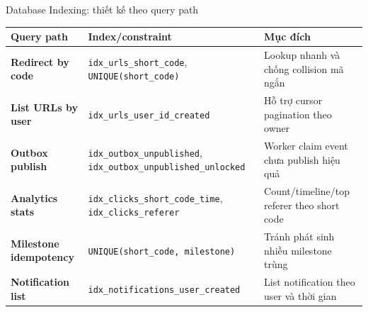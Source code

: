 \documentclass[aspectratio=169]{beamer}
\begin{document}
\begin{frame}{Database Indexing: thiết kế theo query path}
    \scriptsize
    \begin{center}
    \begin{tabular}{>{\bfseries}p{}p{}p{}}
        \toprule
        Query path & Index/constraint & Mục đích \\
        \midrule
        Redirect by code & \texttt{idx\_urls\_short\_code}, \texttt{UNIQUE(short\_code)} & Lookup nhanh và chống collision mã ngắn \\
        List URLs by user & \texttt{idx\_urls\_user\_id\_created} & Hỗ trợ cursor pagination theo owner \\
        Outbox publish & \texttt{idx\_outbox\_unpublished}, \texttt{idx\_outbox\_unpublished\_unlocked} & Worker claim event chưa publish hiệu quả \\
        Analytics stats & \texttt{idx\_clicks\_short\_code\_time}, \texttt{idx\_clicks\_referer} & Count/timeline/top referer theo short code \\
        Milestone idempotency & \texttt{UNIQUE(short\_code, milestone)} & Tránh phát sinh nhiều milestone trùng \\
        Notification list & \texttt{idx\_notifications\_user\_created} & List notification theo user và thời gian \\
        \bottomrule
    \end{tabular}
    \end{center}
\end{frame}
\end{document}

